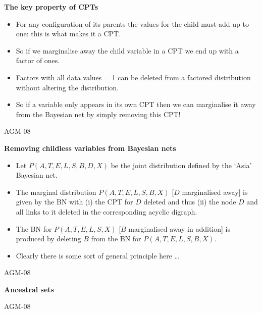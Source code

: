 \documentclass[landscape]{slides}
\newcommand{\lecnum}{AGM-08}
\newcommand{\slidehead}[1]{{\centering \bf #1 \\}}
\newenvironment{titledslide}[1]{\begin{slide}\slidehead{#1}\vfill}{\vfill \tiny \lecnum \end{slide}}
\begin{document}
\begin{titledslide}{The key property of CPTs}
  
  \begin{itemize}
  \item For any configuration of its parents the values for
    the child must add up to one: this is what makes it a CPT.
  \item So if we marginalise away the child variable in a CPT we end
    up with a factor of ones.
  \item Factors with all data values = 1 can be deleted from a
    factored distribution without altering the distribution.
  \item So if a variable only appears in its own CPT then we can
    marginalise it away from the Bayesian net by simply removing this CPT!
  \end{itemize}

\end{titledslide}
\begin{titledslide}{Removing childless variables from Bayesian nets}
  
  \begin{itemize}
  \item Let $P(A,T,E,L,S,B,D,X)$ be the joint distribution defined by
    the `Asia' Bayesian net.
  \item The marginal distribution $P(A,T,E,L,S,B,X)$ [$D$ marginalised
    away] is given by the BN with (i) the CPT for $D$ deleted and thus
    (ii) the node $D$ and all links to it deleted in the corresponding
    acyclic digraph. 
  \item The BN for $P(A,T,E,L,S,X)$ [$B$ marginalised away in
    addition] is produced by deleting $B$ from the BN for $P(A,T,E,L,S,B,X)$.
  \item Clearly there is some sort of general principle here \dots
  \end{itemize}

\end{titledslide}
\begin{titledslide}{Ancestral sets}
  

\end{titledslide}
\end{document}
